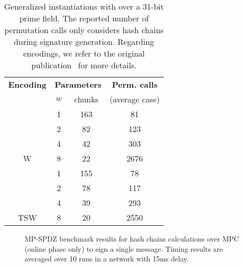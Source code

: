 
\renewcommand\arraystretch{1.25}
\begin{table}[h]
	\centering
	\begin{tabular}{cccc}
		\toprule
    		\textbf{Encoding} & \multicolumn{2}{c}{\textbf{Parameters}}  & \textbf{Perm. calls} \\
    		 & {$w$} & chunks  & (average case)   \\
    		\midrule
	     &  1 & 163 & 81    \\
	     &  2 & 82  & 123 \\
	     &  4 & 42  & 303 \\
	 \multirow{-4}{*}{W}  & 8 & 22 & 2676 \\
	 \midrule
 	   &  1 & 155 &  78   \\
	   &  2 & 78  &  117  \\
	   &  4 & 39  &  293  \\
	 \multirow{-4}{*}{TSW}  &  8 & 20 & 2550  \\
	\hline
	\end{tabular}
	\caption{Generalized \XMSS instantiations with \PoseidonTwo over a 31-bit prime field. The reported number of permutation calls only considers hash chains during signature generation. Regarding encodings, we refer to the original publication~\cite{cryptoeprint:2025/055} for more details.\label{tab:xmss_poseidon2_permcalls}}
\end{table}


\begin{figure}
\centering
{}
\caption{MP-SPDZ benchmark results for \PoseidonTwo hash chains calculations over MPC (online phase only) to sign a single message. Timing results are averaged over 10 runs in a network with 15ms delay.\label{fig:mpspdz-time}}
\end{figure}


